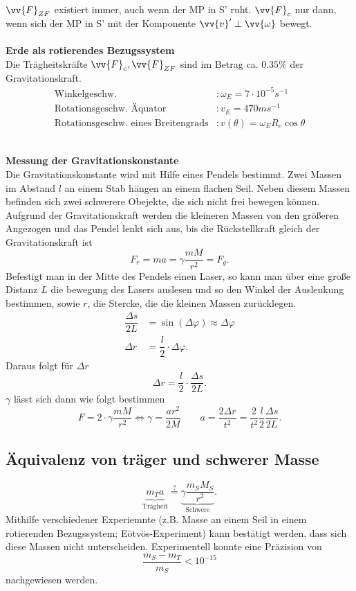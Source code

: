 \documentclass[a4paper,12pt]{article}
\numberwithin{equation}{section}
\begin{document}
$\vv{F}_{ZF}$ existiert immer, auch wenn der MP in S' ruht. $\vv{F}_c$ nur dann, wenn sich der MP in S' mit der Komponente $\vv{v}'\perp \vv{\omega }$ bewegt.
\\\hfill\\\textbf{Erde als rotierendes Bezugssystem}\\
Die Trägheitskräfte $\vv{F}_c,\vv{F}_{ZF}$ sind im Betrag ca. $0.35\%$ der Gravitationskraft.
\begin{align*}
        \text{Winkelgeschw.}&:\omega _E=7\cdot 10^{-5}s ^{-1}\\
        \text{Rotationsgeschw. Äquator}&:v_E=470m s ^{-1}\\
        \text{Rotationsgeschw. eines Breitengrads}&:v\left(\theta \right)=\omega _ER_e\cos \theta 
\end{align*}

\hfill\\\textbf{Messung der Gravitationskonstante}\\ 
Die Gravitationskonstante wird mit Hilfe eines Pendels bestimmt. Zwei Massen im Abstand $l$ an einem Stab hängen an einem flachen Seil. Neben diesem Massen befinden sich zwei schwerere Obejekte, die sich nicht frei bewegen können. Aufgrund der Gravitationskraft werden die kleineren Massen von den größeren Angezogen und das Pendel lenkt sich aus, bis die Rückstellkraft gleich der Gravitationskraft ist
\[ 
        F_r=ma=\gamma \dfrac{mM}{r^2}=F_g
.\] 
Befestigt man in der Mitte des Pendels einen Laser, so kann man über eine große Distanz $L$ die bewegung des Lasers auslesen und so den Winkel der Auslenkung bestimmen, sowie $r$, die Stercke, die die kleinen Massen zurücklegen.
\begin{align*}
        \dfrac{\Delta s}{2L}&=\sin \left(\Delta \varphi \right)\approx \Delta \varphi \\
        \Delta r&=\dfrac{l}{2}\cdot \Delta \varphi 
.\end{align*} 
Daraus folgt für $\Delta r$ 
\[ 
        \Delta r=\dfrac{l}{2}\cdot \dfrac{\Delta s}{2L}
.\] 
$\gamma $ lässt sich dann wie folgt bestimmen
\[ 
        F=2\cdot \gamma \dfrac{mM}{r^2}\Leftrightarrow \gamma =\dfrac{ar^2}{2M}\qquad a=\dfrac{2\Delta r}{t^2}=\dfrac{2}{t^2}\dfrac{l}{2}\dfrac{\Delta s}{2L}
.\] 

\subsection{Äquivalenz von träger und schwerer Masse}
\[ 
        \underbrace{m_Ta}_{\text{Trägheit}}\stackrel{?}{=}\underbrace{\gamma \dfrac{m_SM_S}{r^2}}_{\text{Schwere}}
.\] 
Mithilfe verschiedener Experiemnte (z.B. Masse an einem Seil in einem rotierenden Bezugssystem; Eötvös-Experiment) kann bestätigt werden, dass sich diese Massen nicht unterscheiden. Experimentell konnte eine Präzision von
\[ 
        \dfrac{m_S-m_T}{m_S}<10^{-15}
\] 
nachgewiesen werden.
\end{document}
